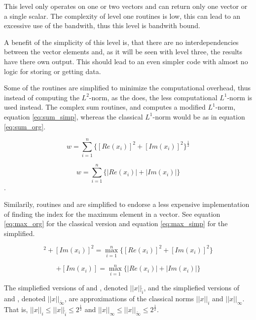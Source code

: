 This level only operates on one or two vectors and can return only one
vector or a single scalar. The complexity of level one routines is
low, this can lead to an excessive use of the bandwith, thus this
level is bandwith bound.

A benefit of the simplicity of this level is, that there are no
interdependencies between the vector elements and, as it will be seen
with level three, the results have there own output. This should lead
to an even simpler code with almost no logic for storing or getting
data.

Some of the routines are simplified to minimize the computational
overhead, thus instead of computing the $L^2$-norm, as
the  does, the less computational $L^1$-norm is used
instead. The complex sum routines, 
and  computes a modified $L^1$-norm,
equation \ref{eq:sum_simp}, whereas the classical $L^1$-norm would be
as in equation \ref{eq:sum_org}\cite{blas_for_fortran}.

\begin{equation}
w = \sum_{i=1}^n\{[Re(x_i)]^2 + [Im(x_i)]^2\}^{\frac{1}{2}}
\label{eq:sum_org}
\end{equation}

\begin{equation}
w = \sum_{i=1}^n\{|Re(x_i)| + |Im(x_i)|\}
\label{eq:sum_simp}
\end{equation}.

Similarily, routines  and  are
simplified to endorse a less expensive implementation of finding the
index for the maximum element in a vector. See
equation \ref{eq:max_org} for the classical version and
equation \ref{eq:max_simp} for the simplified.

\begin{equation}
[Re(x_i)]^2 + [Im(x_i)]^2 = \max_{i=1}^n\{[Re(x_i)]^2 + [Im(x_i)]^2\}
\label{eq:max_org}
\end{equation}

\begin{equation}
[Re(x_i)] + [Im(x_i)] = \max_{i=1}^n\{|Re(x_i)| + |Im(x_i)|\}
\label{eq:max_simp}
\end{equation}

The simpliefied versions of  and ,
denoted $||x||_{\tilde{i}}$, and the simpliefied versions
of  and , denoted
$||x||_{\tilde{\infty}}$, are approximations of the classical norms
$||x||_{i}$ and $||x||_{\infty}$. That is, $||x||_{i} \le
||x||_{\tilde{i}} \le 2^{\frac{1}{2}}$ and $||x||_{\infty} \le
||x||_{\tilde{\infty}} \le 2^{\frac{1}{2}}$.


